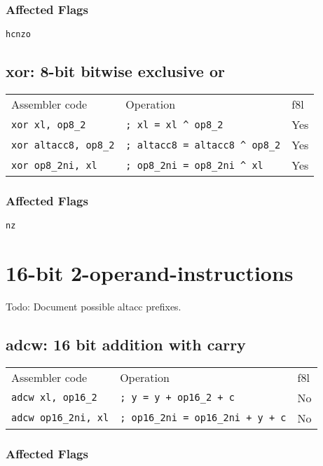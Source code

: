 \documentclass{book}
\begin{document}
\subsubsection*{Affected Flags}

\texttt{hcnzo}


\subsection{xor: 8-bit bitwise exclusive or}

\begin{tabular}{l l l}
Assembler code               & Operation                                & f8l \\
\texttt{xor xl, op8\_2}      & \texttt{; xl = xl \^{} op8\_2}           & Yes \\
\texttt{xor altacc8, op8\_2} & \texttt{; altacc8 = altacc8 \^{} op8\_2} & Yes \\
\texttt{xor op8\_2ni, xl}    & \texttt{; op8\_2ni = op8\_2ni \^{} xl}   & Yes
\end{tabular}

\subsubsection*{Affected Flags}

\texttt{nz}


\section{16-bit 2-operand-instructions}

Todo: Document possible altacc prefixes.

\subsection{adcw: 16 bit addition with carry}

\begin{tabular}{l l l}
Assembler code              & Operation                                & f8l \\
\texttt{adcw xl, op16\_2}   & \texttt{; y = y + op16\_2 + c}           & No \\
\texttt{adcw op16\_2ni, xl} & \texttt{; op16\_2ni = op16\_2ni + y + c} & No
\end{tabular}

\subsubsection*{Affected Flags}
\end{document}
